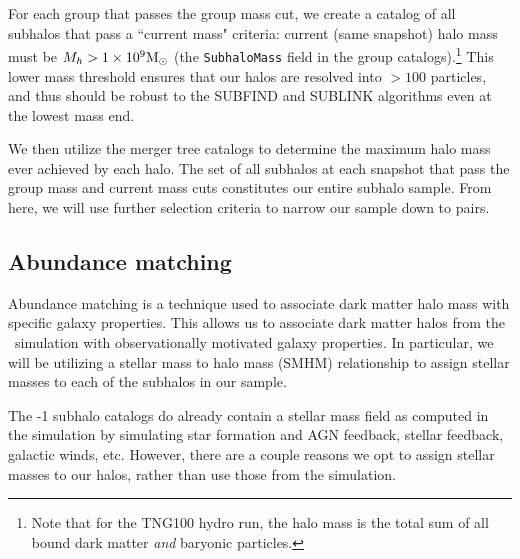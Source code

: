 \documentclass[twocolumn]{aastex631}
\begin{document}
    For each group that passes the group mass cut, we create a catalog of all subhalos that pass a ``current mass" criteria: current (same snapshot) halo mass must be $M_h > 1\times10^{9}\mathrm{M}_\odot$ (the \texttt{SubhaloMass} field in the group catalogs).\footnote{Note that for the TNG100 hydro run, the halo mass is the total sum of all bound dark matter \textit{and} baryonic particles.}
    This lower mass threshold ensures that our halos are resolved into $>100$ particles, and thus should be robust to the SUBFIND and SUBLINK algorithms even at the lowest mass end.  
    
    We then utilize the merger tree catalogs to determine the maximum halo mass ever achieved by each halo. 
    The set of all subhalos at each snapshot that pass the group mass and current mass cuts constitutes our entire subhalo sample. 
    From here, we will use further selection criteria to narrow our sample down to pairs.



    \subsection{Abundance matching} \label{sec:methods-am}
    Abundance matching is a technique used to associate dark matter halo mass with specific galaxy properties.
    This allows us to associate dark matter halos from the \tng\ simulation with observationally motivated galaxy properties. %
    In particular, we will be utilizing a stellar mass to halo mass (SMHM) relationship to assign stellar masses to each of the subhalos in our sample. 

    The -1 subhalo catalogs do already contain a stellar mass field as computed in the simulation by simulating star formation and  AGN feedback, stellar feedback, galactic winds, etc.    
    However, there are a couple reasons we opt to assign stellar masses to our halos, rather than use those from the simulation. 
    
\end{document}
